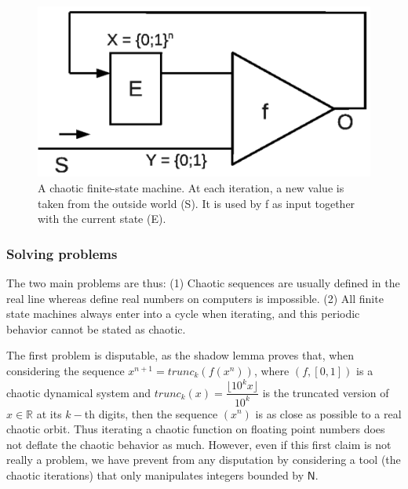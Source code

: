\begin{figure}[h!]
\centerline{\includegraphics[scale=0.5]{Mealy-eps-converted-to.pdf}}
\caption{A chaotic finite-state machine. At each iteration, a new value is taken from the outside world (S). It is used by f as input together with the current state (E).}
\label{fig:Mealy}
\end{figure}

\subsubsection{Solving problems}

The two main problems are thus: (1) Chaotic sequences are usually 
defined in the real line whereas define real numbers on computers 
is impossible. (2) All finite state machines always enter into a cycle
when iterating, and this periodic behavior cannot be stated as chaotic.

The first problem is disputable, as the shadow lemma proves that, when
considering the sequence $x^{n+1} = trunc_k\left(f(x^n)\right)$, where
$(f,[0,1])$ is a chaotic dynamical system and $trunc_k(x) = 
\dfrac{\lfloor 10^k x \rfloor}{10^k}$ is the truncated version of 
$x\in \mathds{R}$ at its $k-$th digits, then the sequence $(x^n)$ is as
close as possible to a real chaotic orbit. Thus iterating a chaotic 
function on floating point numbers does not deflate the chaotic behavior
as much. However, even if this first claim is not really a problem, we
have prevent from any disputation by considering a tool (the chaotic 
iterations) that only manipulates integers bounded by $\mathsf{N}$.


